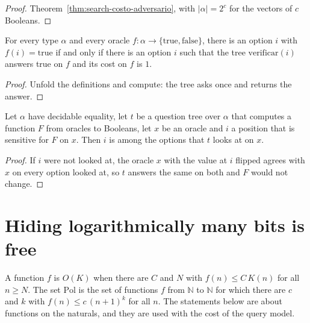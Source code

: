 \begin{proof}
  \leanok
  Theorem~\ref{thm:search-costo-adversario}, with $|\alpha| = 2^c$ for the vectors of $c$ Booleans.
\end{proof}

\begin{theorem}
  \label{thm:search-te-dicen}
  \leanok
  For every type $\alpha$ and every oracle $f : \alpha \to \{\mathrm{true}, \mathrm{false}\}$,
  there is an option $i$ with $f(i) = \mathrm{true}$ if and only if there is an option $i$ such that
  the tree $\mathrm{verificar}(i)$ answers true on $f$ and its cost on $f$ is $1$.
  \own{}
\end{theorem}

\begin{proof}
  \leanok
  Unfold the definitions and compute: the tree asks once and returns the answer.
\end{proof}

\begin{theorem}
  \label{thm:search-lee-lo-sensible}
  \leanok
  Let $\alpha$ have decidable equality, let $t$ be a question tree over $\alpha$ that computes a
  function $F$ from oracles to Booleans, let $x$ be an oracle and $i$ a position that is
  sensitive for $F$ on $x$. Then $i$ is among the options that $t$ looks at on $x$.
  \own{}
\end{theorem}

\begin{proof}
  \leanok
  If $i$ were not looked at, the oracle $x$ with the value at $i$ flipped agrees with $x$ on every
  option looked at, so $t$ answers the same on both and $F$ would not change.
\end{proof}

\section{Hiding logarithmically many bits is free}
\label{sec:search-log-bits}

A function $f$ is $O(K)$ when there are $C$ and $N$ with $f(n) \le C\,K(n)$ for all $n \ge N$. The
set $\mathrm{Pol}$ is the set of functions $f$ from $\mathbb{N}$ to $\mathbb{N}$ for which there are
$c$ and $k$ with $f(n) \le c\,(n+1)^k$ for all $n$. The statements below are about functions on the
naturals, and they are used with the cost of the query model.

